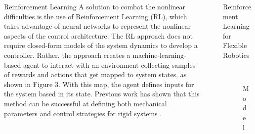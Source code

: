 \documentclass[final]{beamer}
\newlength{\sepwid}
\newlength{\onecolwid}
\newlength{\twocolwid}
\begin{document}
\begin{frame}[t]
\begin{columns}[t]
\begin{column}{\onecolwid}
\begin{block}{Reinforcement Learning}
A solution to combat the nonlinear difficulties is the use of Reinforcement Learning (RL), which takes advantage of neural networks to represent the nonlinear aspects of the control architecture. The RL approach does not require closed-form models of the system dynamics to develop a controller. Rather, the approach creates a machine-learning-based agent to interact with an environment collecting samples of rewards and actions that get mapped to system states, as shown in Figure 3. With this map, the agent defines inputs for the system based in its state. Previous work has shown that this method can be successful at defining both mechanical parameters and control strategies for rigid systems \cite{Ha2019}.
\end{block}


\end{column} %

\begin{column}{\sepwid}\end{column} %


\begin{column}{\twocolwid} %



\begin{block}{Reinforcement Learning for Flexible Robotics}
%
\begin{figure}
    \captionsetup{justification=centering, labelformat=simple}
    \begin{center}
        \vspace{-0.25 in}
        \includegraphics[width=0.17\textwidth]{figures/pogo_stick_model.pdf}
        \caption{Model}
        \vspace{-0.35 in}
        \label{fig:Pogostick}
    \end{center}
\end{figure}
%


\end{block}
\end{column}
\end{columns}
\end{frame}
\end{document}
